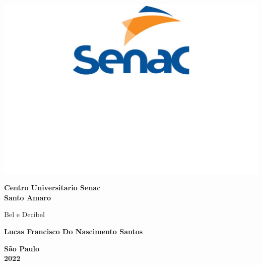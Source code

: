 


\begin{capinha}


\begin{center}
    \parbox{22cm} {\includegraphics[scale=0.35]{SENAC-1 (1).jpg}}
    
    {\large \bf Centro Universitario Senac}\\
    {\large \bf Santo Amaro}\\
    
    \vspace{3 cm}
    
    {\large \bfComoBel Bel e Decibel}
    
    
    \vspace{3.5 cm}
    
    {\large \bf Lucas Francisco Do Nascimento Santos }

    \vspace{2 cm}
    {\large \bf São Paulo \\ 2022}
    
\end{center}




\end{capinha}